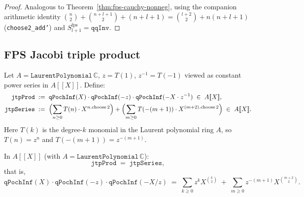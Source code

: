 \begin{proof}\leanok
Analogous to Theorem~\ref{thm:fps-cauchy-nonneg}, using the companion
arithmetic identity $\binom{n}{2} + \binom{n+l+1}{2} + (n+l+1) = \binom{l+2}{2} + n(n+l+1)$
(\texttt{choose2\_add'}) and $S^{\mathrm{fps}}_{l+1} = \texttt{qqInv}$.
\end{proof}

\subsection{FPS Jacobi triple product}
\label{subsec:fps-jtp}

\begin{definition}\label{def:fps-jtp}\leanok{}
Let $A = \texttt{LaurentPolynomial}\,\mathbb{C}$, $z = T(1)$,
$z^{-1} = T(-1)$ viewed as constant power series in $A[\![ X]\!]$.
Define:
\begin{align*}
  \texttt{jtpProd}
  &\;:=\; \texttt{qPochInf}(X)\cdot\texttt{qPochInf}(-z)\cdot\texttt{qPochInf}(-X\cdot z^{-1})
          \;\in\; A[\![ X]\!], \\
  \texttt{jtpSeries}
  &\;:=\; \Bigl(\sum_{n\ge 0} T(n)\cdot X^{n\text{.choose}\,2}\Bigr)
          + \Bigl(\sum_{m\ge 0} T(-(m+1))\cdot X^{(m+2)\text{.choose}\,2}\Bigr)
          \;\in\; A[\![ X]\!].
\end{align*}
Here $T(k)$ is the degree-$k$ monomial in the Laurent polynomial ring $A$,
so $T(n) = z^n$ and $T(-(m+1)) = z^{-(m+1)}$.
\end{definition}

\begin{theorem}\label{thm:fps-jtp}\leanok{}
In $A[\![ X]\!]$ (with $A = \texttt{LaurentPolynomial}\,\mathbb{C}$):
\[
  \texttt{jtpProd} \;=\; \texttt{jtpSeries},
\]
that is,
\[
  \texttt{qPochInf}(X)\cdot\texttt{qPochInf}(-z)\cdot\texttt{qPochInf}(-X/z)
  \;=\;
  \sum_{k \ge 0} z^k X^{\binom{k}{2}}
  \;+\;
  \sum_{m \ge 0} z^{-(m+1)} X^{\binom{m+2}{2}}.
\]
\end{theorem}

